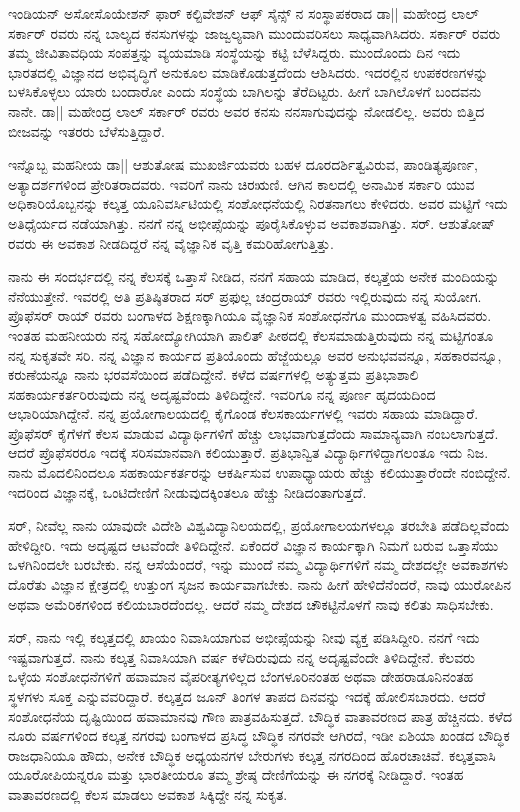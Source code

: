 ಇಂಡಿಯನ್ ಅಸೋಸೊಯೇಶನ್ ಫಾರ್ ಕಲ್ಟಿವೇಶನ್ ಆಫ್ ಸೈನ್ಸ್ ನ ಸಂಸ್ಥಾಪಕರಾದ ಡಾ|| ಮಹೇಂದ್ರ ಲಾಲ್ ಸರ್ಕಾರ್ ರವರು ನನ್ನ ಬಾಲ್ಯದ ಕನಸುಗಳನ್ನು ಜಾಜ್ವಲ್ಯವಾಗಿ ಮುಂದುವರಿಸಲು ಸಾಧ್ಯವಾಗಿಸಿದರು. ಸರ್ಕಾರ್ ರವರು ತಮ್ಮ ಜೀವಿತಾವಧಿಯ ಸಂಪತ್ತನ್ನು ವ್ಯಯಮಾಡಿ ಸಂಸ್ಥೆಯನ್ನು ಕಟ್ಟಿ ಬೆಳೆಸಿದ್ದರು. ಮುಂದೊಂದು ದಿನ ಇದು ಭಾರತದಲ್ಲಿ ವಿಜ್ಞಾನದ ಅಭಿವೃದ್ಧಿಗೆ ಅನುಕೂಲ ಮಾಡಿಕೊಡುತ್ತದೆಂದು ಆಶಿಸಿದರು. ಇದರಲ್ಲಿನ ಉಪಕರಣಗಳನ್ನು ಬಳಸಿಕೊಳ್ಳಲು ಯಾರು ಬಂದಾರೋ ಎಂದು ಸಂಸ್ಥೆಯ ಬಾಗಿಲನ್ನು ತೆರೆದಿಟ್ಟರು. ಹೀಗೆ ಬಾಗಿಲೊಳಗೆ ಬಂದವನು ನಾನೇ. ಡಾ|| ಮಹೇಂದ್ರ ಲಾಲ್ ಸರ್ಕಾರ್ ರವರು ಅವರ ಕನಸು ನನಸಾಗುವುದನ್ನು ನೋಡಲಿಲ್ಲ. ಅವರು ಬಿತ್ತಿದ ಬೀಜವನ್ನು ಇತರರು ಬೆಳೆಸುತ್ತಿದ್ದಾರೆ.

ಇನ್ನೊಬ್ಬ ಮಹನೀಯ ಡಾ|| ಆಶುತೋಷ ಮುಖರ್ಜಿಯವರು ಬಹಳ ದೂರದರ್ಶಿತ್ವವಿರುವ, ಪಾಂಡಿತ್ಯಪೂರ್ಣ, ಅತ್ಯಾದರ್ಶಗಳಿಂದ ಪ್ರೇರಿತರಾದವರು. ಇವರಿಗೆ ನಾನು ಚಿರಋಣಿ. ಆಗಿನ ಕಾಲದಲ್ಲಿ ಅನಾಮಿಕ ಸರ್ಕಾರಿ ಯುವ ಅಧಿಕಾರಿಯೊಬ್ಬನನ್ನು ಕಲ್ಕತ್ತ ಯೂನಿವರ್ಸಿಟಿಯಲ್ಲಿ ಸಂಶೋಧನೆಯಲ್ಲಿ ನಿರತನಾಗಲು ಕೇಳಿದರು. ಅವರ ಮಟ್ಟಿಗೆ ಇದು ಅತಿಧೈರ್ಯದ ನಡೆಯಾಗಿತ್ತು. ನನಗೆ ನನ್ನ ಅಭೀಪ್ಸೆಯನ್ನು ಪೂರೈಸಿಕೊಳ್ಳುವ ಅವಕಾಶವಾಗಿತ್ತು. ಸರ್. ಆಶುತೋಷ್ ರವರು ಈ ಅವಕಾಶ ನೀಡದಿದ್ದರೆ ನನ್ನ ವೈಜ್ಞಾನಿಕ ವೃತ್ತಿ ಕಮರಿಹೋಗುತ್ತಿತ್ತು.

ನಾನು ಈ ಸಂದರ್ಭದಲ್ಲಿ ನನ್ನ ಕೆಲಸಕ್ಕೆ ಒತ್ತಾಸೆ ನೀಡಿದ, ನನಗೆ ಸಹಾಯ ಮಾಡಿದ, ಕಲ್ಕತ್ತೆಯ ಅನೇಕ ಮಂದಿಯನ್ನು ನೆನೆಯುತ್ತೇನೆ. ಇವರಲ್ಲಿ ಅತಿ ಪ್ರತಿಷ್ಠಿತರಾದ ಸರ್ ಪ್ರಫುಲ್ಲ ಚಂದ್ರರಾಯ್ ರವರು ಇಲ್ಲಿರುವುದು ನನ್ನ ಸುಯೋಗ. ಪ್ರೊಫೆಸರ್ ರಾಯ್ ರವರು ಬಂಗಾಳದ ಶಿಕ್ಷಣಕ್ಕಾಗಿಯೂ ವೈಜ್ಞಾನಿಕ ಸಂಶೋಧನೆಗೂ ಮುಂದಾಳತ್ವ ವಹಿಸಿದವರು. ಇಂತಹ ಮಹನೀಯರು ನನ್ನ ಸಹೋದ್ಯೋಗಿಯಾಗಿ ಪಾಲಿತ್ ಪೀಠದಲ್ಲಿ ಕೆಲಸಮಾಡುತ್ತಿರುವುದು ನನ್ನ ಮಟ್ಟಿಗಂತೂ ನನ್ನ ಸುಕೃತವೇ ಸರಿ. ನನ್ನ ವಿಜ್ಞಾನ ಕಾರ್ಯದ ಪ್ರತಿಯೊಂದು ಹೆಜ್ಜೆಯಲ್ಲೂ ಅವರ ಅನುಭವವನ್ನೂ, ಸಹಕಾರವನ್ನೂ, ಕರುಣೆಯನ್ನೂ ನಾನು ಭರವಸೆಯಿಂದ ಪಡೆದಿದ್ದೇನೆ. ಕಳೆದ  ವರ್ಷಗಳಲ್ಲಿ ಅತ್ಯುತ್ತಮ ಪ್ರತಿಭಾಶಾಲಿ ಸಹಕಾರ್ಯಕರ್ತರಿರುವುದು ನನ್ನ ಅದೃಷ್ಟವೆಂದು ತಿಳಿದಿದ್ದೇನೆ. ಇವರಿಗೂ ನನ್ನ ಪೂರ್ಣ ಹೃದಯದಿಂದ ಆಭಾರಿಯಾಗಿದ್ದೇನೆ. ನನ್ನ ಪ್ರಯೋಗಾಲಯದಲ್ಲಿ ಕೈಗೊಂಡ ಕೆಲಸಕಾರ್ಯಗಳಲ್ಲಿ ಇವರು ಸಹಾಯ ಮಾಡಿದ್ದಾರೆ. ಪ್ರೊಫೆಸರ್ ಕೈಗೆಳಗೆ ಕೆಲಸ ಮಾಡುವ ವಿದ್ಯಾರ್ಥಿಗಳಿಗೆ ಹೆಚ್ಚು ಲಾಭವಾಗುತ್ತದೆಂದು ಸಾಮಾನ್ಯವಾಗಿ ನಂಬಲಾಗುತ್ತದೆ. ಆದರೆ ಪ್ರೊಫೆಸರರೂ ಇದಕ್ಕೆ ಸರಿಸಮಾನವಾಗಿ ಕಲಿಯುತ್ತಾರೆ. ಪ್ರತಿಭಾನ್ವಿತ ವಿದ್ಯಾರ್ಥಿಗಳಿದ್ದಾಗಲಂತೂ ಇದು ನಿಜ. ನಾನು ಮೊದಲಿನಿಂದಲೂ ಸಹಕಾರ್ಯಕರ್ತರನ್ನು ಆಕರ್ಷಿಸುವ ಉಪಾಧ್ಯಾಯರು ಹೆಚ್ಚು ಕಲಿಯುತ್ತಾರೆಂದೇ ನಂಬಿದ್ದೇನೆ. ಇದರಿಂದ ವಿಜ್ಞಾನಕ್ಕೆ, ಒಂಟಿದೇಣಿಗೆ ನೀಡುವುದಕ್ಕಿಂತಲೂ ಹೆಚ್ಚು ನೀಡಿದಂತಾಗುತ್ತದೆ.

ಸರ್, ನೀವೆಲ್ಲ ನಾನು ಯಾವುದೇ ವಿದೇಶಿ ವಿಶ್ವವಿದ್ಯಾನಿಲಯದಲ್ಲಿ, ಪ್ರಯೋಗಾಲಯಗಳಲ್ಲೂ ತರಬೇತಿ ಪಡೆದಿಲ್ಲವೆಂದು ಹೇಳಿದ್ದೀರಿ. ಇದು ಅದೃಷ್ಟದ ಆಟವೆಂದೇ ತಿಳಿದಿದ್ದೇನೆ. ಏಕೆಂದರೆ ವಿಜ್ಞಾನ ಕಾರ್ಯಕ್ಕಾಗಿ ನಿಮಗೆ ಬರುವ ಒತ್ತಾಸೆಯು ಒಳಗಿನಿಂದಲೇ ಬರಬೇಕು. ನನ್ನ ಆಸೆಯೆಂದರೆ, ಇನ್ನು ಮುಂದೆ ನಮ್ಮ ವಿದ್ಯಾರ್ಥಿಗಳಿಗೆ ನಮ್ಮ ದೇಶದಲ್ಲೇ ಅವಕಾಶಗಳು ದೊರೆತು ವಿಜ್ಞಾನ ಕ್ಷೇತ್ರದಲ್ಲಿ ಉತ್ತುಂಗ ಸೃಜನ ಕಾರ್ಯವಾಗಬೇಕು. ನಾನು ಹೀಗೆ ಹೇಳಿದೆನೆಂದರೆ, ನಾವು ಯುರೋಪಿನ ಅಥವಾ ಅಮೆರಿಕಗಳಿಂದ ಕಲಿಯಬಾರದೆಂದಲ್ಲ. ಆದರೆ ನಮ್ಮ ದೇಶದ ಚೌಕಟ್ಟಿನೊಳಗೆ ನಾವು ಕಲಿತು ಸಾಧಿಸಬೇಕು.

ಸರ್, ನಾನು ಇಲ್ಲಿ ಕಲ್ಕತ್ತದಲ್ಲಿ ಖಾಯಂ ನಿವಾಸಿಯಾಗುವ ಅಭೀಪ್ಸೆಯನ್ನು ನೀವು ವ್ಯಕ್ತ ಪಡಿಸಿದ್ದೀರಿ. ನನಗೆ ಇದು ಇಷ್ಟವಾಗುತ್ತದೆ. ನಾನು ಕಲ್ಕತ್ತ ನಿವಾಸಿಯಾಗಿ  ವರ್ಷ ಕಳೆದಿರುವುದು ನನ್ನ ಅದೃಷ್ಟವೆಂದೇ ತಿಳಿದಿದ್ದೇನೆ. ಕೆಲವರು ಒಳ್ಳೆಯ ಸಂಶೋಧನೆಗಳಿಗೆ ಹವಾಮಾನ ವೈಪರೀತ್ಯಗಳಿಲ್ಲದ ಬೆಂಗಳೂರಿನಂತಹ ಅಥವಾ ಡೇಹರಾಡೂನಿನಂತಹ ಸ್ಥಳಗಳು ಸೂಕ್ತ ಎನ್ನುವವರಿದ್ದಾರೆ. ಕಲ್ಕತ್ತದ ಜೂನ್ ತಿಂಗಳ ತಾಪದ ದಿನವನ್ನು ಇದಕ್ಕೆ ಹೋಲಿಸಬಾರದು. ಆದರೆ ಸಂಶೋಧನೆಯ ದೃಷ್ಟಿಯಿಂದ ಹವಾಮಾನವು ಗೌಣ ಪಾತ್ರವಹಿಸುತ್ತದೆ. ಬೌದ್ಧಿಕ ವಾತಾವರಣದ ಪಾತ್ರ ಹೆಚ್ಚಿನದು. ಕಳೆದ ನೂರು ವರ್ಷಗಳಿಂದ ಕಲ್ಕತ್ತ ನಗರವು ಬಂಗಾಳದ ಪ್ರಸಿದ್ಧ ಬೌದ್ಧಿಕ ನಗರವೇ ಆಗಿರದೆ, ಇಡೀ ಏಶಿಯಾ ಖಂಡದ ಬೌದ್ಧಿಕ ರಾಜಧಾನಿಯೂ ಹೌದು, ಅನೇಕ ಬೌದ್ಧಿಕ ಅಧ್ಯಯನಗಳ ಬೇರುಗಳು ಕಲ್ಕತ್ತ ನಗರದಿಂದ ಹೊರಚಾಚಿವೆ. ಕಲ್ಕತ್ತವಾಸಿ ಯೂರೋಪಿಯನ್ನರೂ ಮತ್ತು ಭಾರತೀಯರೂ ತಮ್ಮ ಶ್ರೇಷ್ಠ ದೇಣಿಗೆಯನ್ನು ಈ ನಗರಕ್ಕೆ ನೀಡಿದ್ದಾರೆ. ಇಂತಹ ವಾತಾವರಣದಲ್ಲಿ ಕೆಲಸ ಮಾಡಲು ಅವಕಾಶ ಸಿಕ್ಕಿದ್ದೇ ನನ್ನ ಸುಕೃತ.

